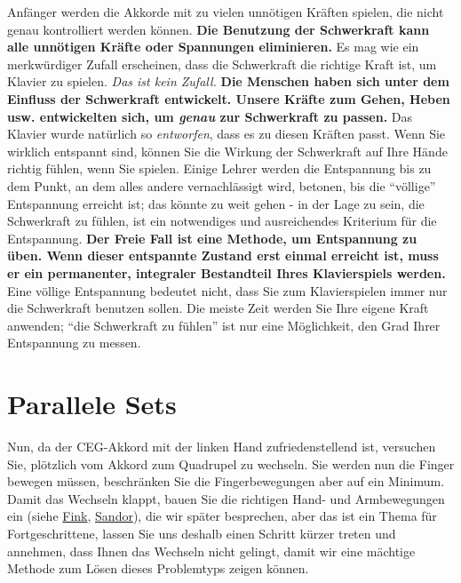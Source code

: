 Anfänger werden die Akkorde mit zu vielen unnötigen Kräften spielen, die nicht genau kontrolliert werden können.
\textbf{Die Benutzung der Schwerkraft kann alle unnötigen Kräfte oder Spannungen eliminieren.}
Es mag wie ein merkwürdiger Zufall erscheinen, dass die Schwerkraft die richtige Kraft ist, um Klavier zu spielen.
\textit{Das ist kein Zufall.}
\textbf{Die Menschen haben sich unter dem Einfluss der Schwerkraft entwickelt.
Unsere Kräfte zum Gehen, Heben usw. entwickelten sich, um \textit{genau} zur Schwerkraft zu passen.}
Das Klavier wurde natürlich so \textit{entworfen}, dass es zu diesen Kräften passt.
Wenn Sie wirklich entspannt sind, können Sie die Wirkung der Schwerkraft auf Ihre Hände richtig fühlen, wenn Sie spielen.
Einige Lehrer werden die Entspannung bis zu dem Punkt, an dem alles andere vernachlässigt wird, betonen, bis die \enquote{völlige} Entspannung erreicht ist; das könnte zu weit gehen - in der Lage zu sein, die Schwerkraft zu fühlen, ist ein notwendiges und ausreichendes Kriterium für die Entspannung.
\textbf{Der Freie Fall ist eine Methode, um Entspannung zu üben.
Wenn dieser entspannte Zustand erst einmal erreicht ist, muss er ein permanenter, integraler Bestandteil Ihres Klavierspiels werden.}
Eine völlige Entspannung bedeutet nicht, dass Sie zum Klavierspielen immer nur die Schwerkraft benutzen sollen.
Die meiste Zeit werden Sie Ihre eigene Kraft anwenden; \enquote{die Schwerkraft zu fühlen} ist nur eine Möglichkeit, den Grad Ihrer Entspannung zu messen.


\section{Parallele Sets}
\label{c1ii11}

Nun, da der CEG-Akkord mit der linken Hand zufriedenstellend ist, versuchen Sie, plötzlich vom Akkord zum Quadrupel zu wechseln.
Sie werden nun die Finger bewegen müssen, beschränken Sie die Fingerbewegungen aber auf ein Minimum.
Damit das Wechseln klappt, bauen Sie die richtigen Hand- und Armbewegungen ein (siehe \hyperref[Fink]{Fink}, \hyperref[Sandor]{Sandor}), die wir später besprechen, aber das ist ein Thema für Fortgeschrittene, lassen Sie uns deshalb einen Schritt kürzer treten und annehmen, dass Ihnen das Wechseln nicht gelingt, damit wir eine mächtige Methode zum Lösen dieses Problemtyps zeigen können.


